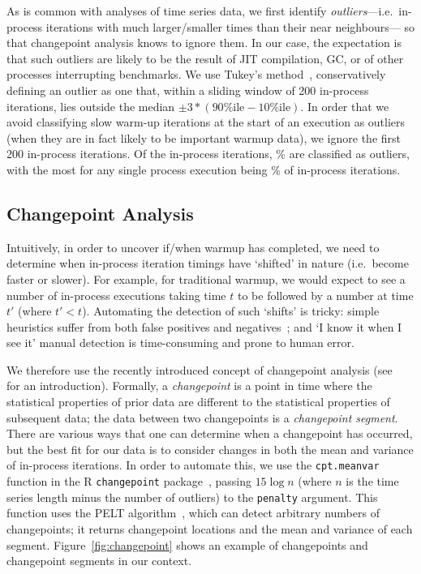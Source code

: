 \documentclass[acmlarge]{acmart}\settopmatter{printfolios=true}
\begin{document}
As is common with analyses of time series data, we first identify
\emph{outliers}---i.e.~in-process iterations with much larger/smaller times than their near
neighbours--- so that changepoint analysis knows to ignore them. In our case, the
expectation is that such outliers are likely to be the result of JIT compilation,
GC, or of other processes interrupting benchmarks. We use Tukey's
method~\cite{tukey1977exploratory}, conservatively defining an outlier as one that, within a
sliding window of 200 in-process iterations, lies outside the median $\pm
3*(90\%\textrm{ile} - 10\%\textrm{ile})$. In order that we avoid classifying
slow warm-up iterations at the start of an execution as outliers (when they are
in fact likely to be important warmup data), we ignore the first 200 in-process
iterations. Of the \totaliterations\xspace in-process
iterations, \totaloutlierspercentage\% are classified as outliers, with the most for
%
any single process execution being \result\% of in-process iterations.


\subsection{Changepoint Analysis}

Intuitively, in order to uncover if/when warmup has completed, we need to
determine when in-process iteration timings have `shifted' in nature (i.e.~become
faster or slower). For example, for traditional warmup, we would expect to see a
number of in-process executions taking time $t$ to be followed by a number at
time $t'$ (where $t' < t$). Automating the detection of such `shifts' is
tricky: simple heuristics suffer from both false positives and negatives~\cite{kalibera13rigorous}; and
`I know it when I see it' manual detection is time-consuming and prone to human
error.

We therefore use the recently introduced concept of changepoint analysis
(see~\cite{eckley11analysis} for an introduction). Formally, a
\emph{changepoint} is a point in time where the statistical properties of prior
data are different to the statistical properties of subsequent data; the data
between two changepoints is a \emph{changepoint segment}. There are various
ways that one can determine when a changepoint has occurred, but the best fit
for our data is to consider changes in both the mean and variance of in-process
iterations. In order to automate this, we use the \texttt{cpt.meanvar} function in the R
\texttt{changepoint} package~\cite{killick14changepoint}, passing $15\log{n}$ (where
$n$ is the time series length minus the number of outliers) to the
\texttt{penalty} argument. This function uses the PELT
algorithm~\citep{killick12optimal}, which can detect arbitrary numbers of changepoints; it
returns changepoint locations and the mean and variance
of each segment. Figure~\ref{fig:changepoint} shows an example of changepoints and
changepoint segments in our context.
\end{document}
